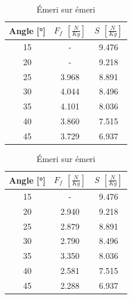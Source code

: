 \documentclass[twoside,twocolumn]{article}
\begin{document}
\begin{table}[H]
\centering
\caption{Plastique sur plastique}
\begin{tabular}{|c|c|c|}
\hline
Angle [°] & $F_{f}$ $\left[ \frac{N}{Kg} \right]$  &$S$ $\left[ \frac{N}{Kg} \right]$\\
           \hline \hline
15        &- & 9.476 \\
           \hline
20        &- & 9.218 \\
           \hline
25        &3.968 & 8.891 \\
           \hline
30        &4.044 & 8.496 \\
           \hline
35        &4.101 & 8.036 \\
           \hline
40        &3.860 & 7.515 \\
           \hline
45        &3.729 & 6.937 \\
           \hline
\end{tabular}
\label{table:v-app}

\caption{Émeri sur émeri}
\begin{tabular}{|c|c|c|}
\hline
Angle [°] & $F_{f}$ $\left[ \frac{N}{Kg} \right]$ &$S$ $\left[ \frac{N}{Kg} \right]$ \\
           \hline  \hline
15        &- & 9.476 \\
           \hline
20        &2.940 & 9.218 \\
           \hline
25        &2.879 & 8.891 \\
           \hline
30        &2.790 & 8.496 \\
           \hline
35        &3.350 & 8.036 \\
           \hline
40        &2.581 & 7.515 \\
           \hline
45        &2.288 & 6.937 \\
           \hline
\end{tabular}
\label{table:v-aee}
\end{table}
\end{document}
